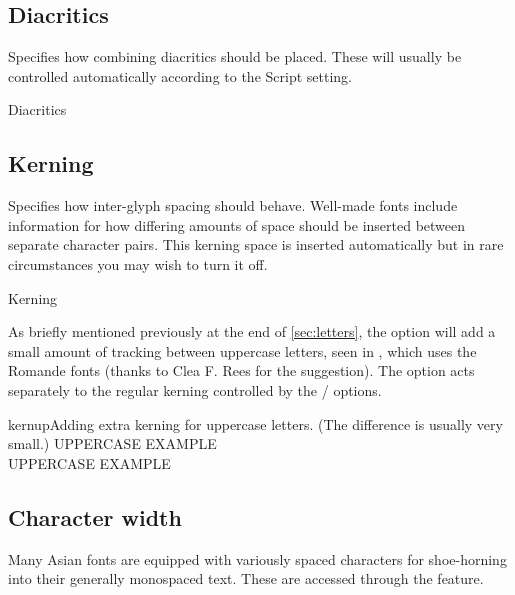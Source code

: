 \documentclass[a4paper]{l3doc}
\begin{document}
\subsection{Diacritics}
Specifies how combining diacritics should be placed.
These will usually be controlled automatically
according to the Script setting.

\begin{features}{Diacritics}
\end{features}

\subsection{Kerning}\label{sec:kerning}
Specifies how inter-glyph spacing should behave.
Well-made fonts include information for how differing
amounts of space should be inserted between separate character pairs.
This kerning space is inserted automatically but in rare
circumstances you may wish to turn it off.

\begin{features}{Kerning}
\end{features}

As briefly mentioned previously at the end of \vref{sec:letters},
the  option will add a small amount of tracking between
uppercase letters, seen in , which uses the Romande
fonts
(thanks to Clea F. Rees for the suggestion).
The  option acts separately to the regular kerning
controlled by the / options.

\begin{Xexample}[firstline=2]{kernup}{Adding extra kerning for uppercase letters. (The difference is usually very small.)}
  \large
   UPPERCASE EXAMPLE \\
   UPPERCASE EXAMPLE
\end{Xexample}


\subsection{Character width}\label{sec:CharacterWidth}
Many Asian fonts are equipped with variously spaced characters for
shoe-horning into their generally monospaced text.
These are
accessed through the  feature.
\end{document}
